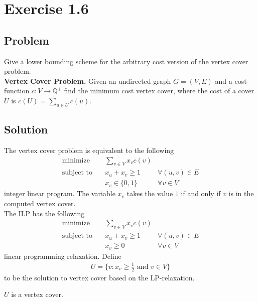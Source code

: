 \documentclass{article}
\begin{document}
\section*{Exercise 1.6}

\subsection*{Problem}

Give a lower bounding scheme for the arbitrary cost version of the vertex cover problem. 
\\

\textbf{Vertex Cover Problem.} Given an undirected graph $G = (V, E)$ and a cost 
function $c : V \rightarrow \mathbb{Q}^+$ find the minimum cost vertex cover, where the
cost of a cover $U$ is $c(U) = \sum\limits_{u \in U} c(u)$.

\subsection*{Solution}

The vertex cover problem is equivalent to the following 
\begin{align*}
    \text{minimize} \quad & \sum\limits_{v \in V} x_v c(v) \\
    \text{subject to} \quad
        & x_u + x_v \geq 1 \quad & \forall (u, v) \in E \\
        & x_v \in \{0, 1\} \quad & \forall v \in V
\end{align*}
integer linear program. The variable $x_v$ takes the value $1$ if and only if $v$ is in 
the computed vertex cover. \\

The ILP has the following
\begin{align*}
    \text{minimize} \quad & \sum\limits_{v \in V} x_v c(v) \\
    \text{subject to} \quad
        & x_u + x_v \geq 1 \quad & \forall (u, v) \in E \\
        & x_v \geq 0 \quad & \forall v \in V
\end{align*}
linear programming relaxation. Define
\begin{align*}
    U = \{v : x_v \geq \frac{1}{2} \text{ and } v \in V\}
\end{align*}
to be the solution to vertex cover based on the LP-relaxation.

\begin{theorem*}
    $U$ is a vertex cover.
\end{theorem*}
\end{document}

